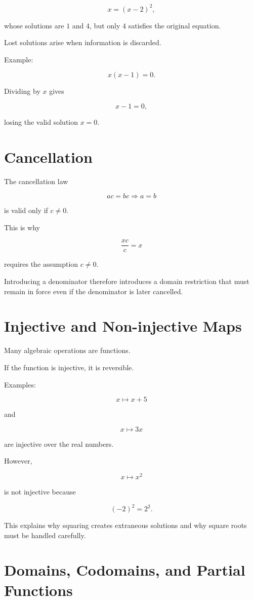 \documentclass{essay}
\begin{document}
\[ x=(x-2)^2, \]

whose solutions are $1$ and $4$, but only $4$ satisfies the original equation.

Lost solutions arise when information is discarded.

Example:

\[ x(x-1)=0. \]

Dividing by $x$ gives

\[ x-1=0, \]

losing the valid solution $x=0$.

\section{Cancellation}

The cancellation law

\[ ac=bc\Longrightarrow a=b \]

is valid only if $c\neq0$.

This is why

\[ \frac{xc}{c}=x \]

requires the assumption $c\neq0$.

Introducing a denominator therefore introduces a domain restriction that must
remain in force even if the denominator is later cancelled.

\section{Injective and Non-injective Maps}

Many algebraic operations are functions.

If the function is injective, it is reversible.

Examples:

\[ x\mapsto x+5 \]

and

\[ x\mapsto 3x \]

are injective over the real numbers.

However,

\[ x\mapsto x^2 \]

is not injective because

\[ (-2)^2=2^2. \]

This explains why squaring creates extraneous solutions and why square roots
must be handled carefully.

\section{Domains, Codomains, and Partial Functions}
\end{document}
